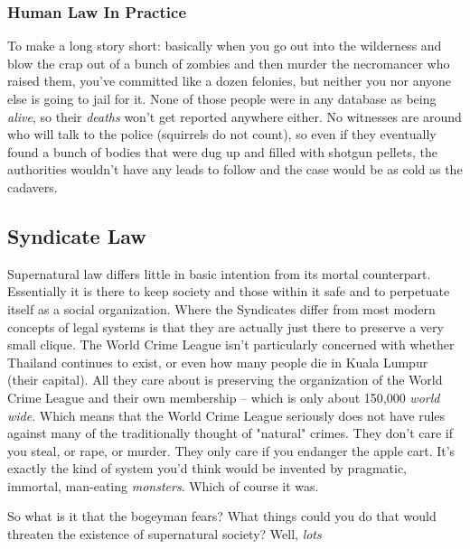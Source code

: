 \subsubsection{Human Law In Practice}
To make a long story short: basically when you go out into the wilderness and blow the crap out of a bunch of zombies and then murder the necromancer who raised them, you've committed like a dozen felonies, but neither you nor anyone else is going to jail for it. None of those people were in any database as being \textit{alive}, so their \textit{deaths} won't get reported anywhere either. No witnesses are around who will talk to the police (squirrels do not count), so even if they eventually found a bunch of bodies that were dug up and filled with shotgun pellets, the authorities wouldn't have any leads to follow and the case would be as cold as the cadavers.


\subsection{Syndicate Law}

\hspace{\parindent} Supernatural law differs little in basic intention from its mortal counterpart. Essentially it is there to keep society and those within it safe and to perpetuate itself as a social organization. Where the Syndicates differ from most modern concepts of legal systems is that they are actually just there to preserve a very small clique. The World Crime League isn't particularly concerned with whether Thailand continues to exist, or even how many people die in Kuala Lumpur (their capital). All they care about is preserving the organization of the World Crime League and their own membership -- which is only about 150,000 \textit{world wide}. Which means that the World Crime League seriously does not have rules against many of the traditionally thought of "natural" crimes. They don't care if you steal, or rape, or murder. They only care if you endanger the apple cart. It's exactly the kind of system you'd think would be invented by pragmatic, immortal, man-eating \textit{monsters}. Which of course it was.

So what is it that the bogeyman fears? What things could you do that would threaten the existence of supernatural society? Well, \textit{lots}

